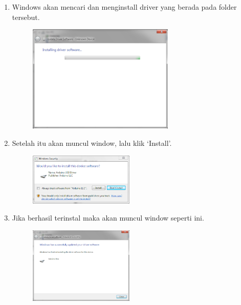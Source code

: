 \begin{enumerate}
\begin{figure}[H]
		\centering
	\end{figure}
\item Windows akan mencari dan menginstall driver yang berada pada folder tersebut.
	\begin{figure}[H]
		\includegraphics[width=7cm]{figures/5/1144124/Teori/8.png}
		\centering
	\end{figure}
\item Setelah itu akan muncul window, lalu klik `Install'.
	\begin{figure}[H]
		\includegraphics[width=5cm]{figures/5/1144124/Teori/9.png}
		\centering
	\end{figure}
\item Jika berhasil terinstal maka akan muncul window seperti ini.
	\begin{figure}[H]
		\includegraphics[width=5cm]{figures/5/1144124/Teori/10.png}
		\centering
	\end{figure}
\end{enumerate}

